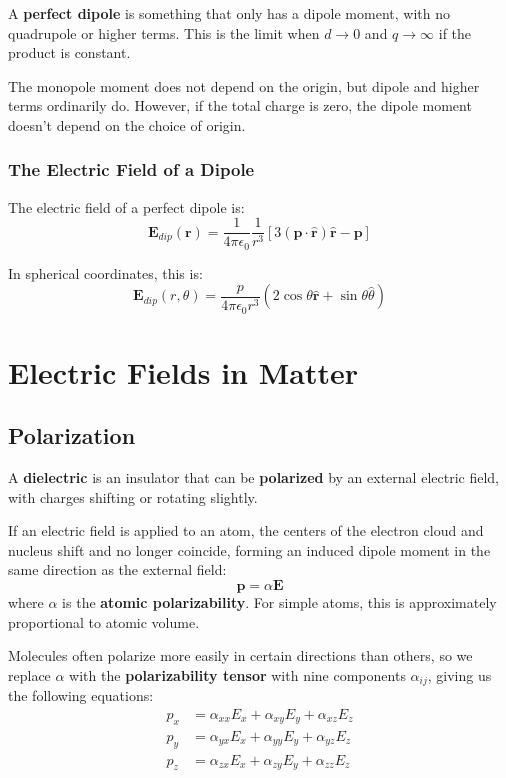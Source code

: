\documentclass{article}
\begin{document}
A \textbf{perfect dipole} is something that only has a dipole moment, with no quadrupole or higher terms. This is the limit when \(d\to 0 \) and \(q\to \infty \) if the product is constant.

\begin{note}
    The monopole moment does not depend on the origin, but dipole and higher terms ordinarily do. However, 
    if the total charge is zero, the dipole moment doesn't depend on the choice of origin.
\end{note}

\subsubsection{The Electric Field of a Dipole}
The electric field of a perfect dipole is:
\[
    \mathbf{E}_{dip}(\mathbf{r} )=\frac{1}{4 \pi  \epsilon_0}\frac{1}{r^3}[3(\mathbf{p} \cdot \mathbf{\hat{r}} )\mathbf{\hat{r}} -\mathbf{p} ]
\]

In spherical coordinates, this is:
\[
    \mathbf{E}_{dip}(r, \theta )=\frac{p}{4 \pi \epsilon_0 r^3}(2 \cos \theta \mathbf{\hat{r}} +\sin \theta \hat{\theta })
\]

\newpage
\section{Electric Fields in Matter}

\subsection{Polarization}
\begin{definition}
    A \textbf{dielectric} is an insulator that can be \textbf{polarized} by an external electric field, with charges shifting or rotating slightly.
\end{definition}

If an electric field is applied to an atom, the centers of the electron cloud and nucleus shift and no longer coincide, 
forming an induced dipole moment in the same direction as the external field:
\[
    \mathbf{p} =\alpha \mathbf{E} 
\] 
where \(\alpha \) is the \textbf{atomic polarizability}. For simple atoms, this is approximately proportional to atomic volume.

Molecules often polarize more easily in certain directions than others, so we replace \(\alpha \) with the \textbf{polarizability tensor} with nine components \(\alpha_{ij}\), giving us the following equations:
\begin{align*}
    p_x&=\alpha_{xx}E_x+\alpha _{xy}E_y+\alpha_{xz}E_z \\
    p_y&=\alpha_{yx}E_x+\alpha_{yy}E_y+\alpha_{yz}E_z \\
    p_z&=\alpha_{zx}E_x+\alpha_{zy}E_y+\alpha_{zz}E_z
\end{align*}
\end{document}
